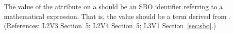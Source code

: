 The value of the  attribute on a \Trigger should be an SBO
identifier referring to a mathematical expression.  That is, the value
should be a term derived from \sbomathformula.  (References: 
L2V3 Section~5; L2V4 Section~5; L3V1 Section~\ref{sec:sbo}.)
